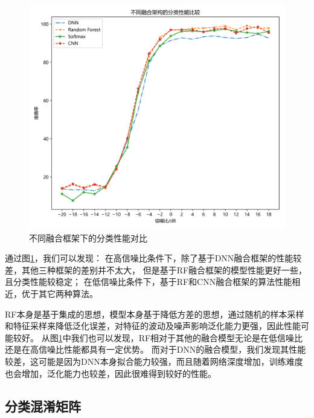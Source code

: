 \begin{figure}[!h]
	\centering
	\includegraphics[scale=0.6]{figures/chapter_4/fig_4_5}
	\caption{不同融合框架下的分类性能对比}\label{sec:fig_4_5}
\end{figure}

通过图\ref{sec:fig_4_5}，我们可以发现：
在高信噪比条件下，除了基于DNN融合框架的性能较差，其他三种框架的差别并不太大，
但是基于RF融合框架的模型性能更好一些，且分类性能较稳定；
在低信噪比条件下，基于RF和CNN融合框架的算法性能相近，优于其它两种算法。\par

RF本身是基于集成的思想，模型本身基于降低方差的思想，通过随机的样本采样和特征采样来降低泛化误差，对特征的波动及噪声影响泛化能力更强，因此性能可能较好。
从图\ref{sec:fig_4_5}中我们也可以发现，RF相对于其他的融合模型无论是在低信噪比还是在高信噪比性能都具有一定优势。
而对于DNN的融合模型，我们发现其性能较差，这可能是因为DNN本身拟合能力较强，而且随着网络深度增加，训练难度也会增加，泛化能力也较差，因此很难得到较好的性能。\par

\subsection{分类混淆矩阵}

